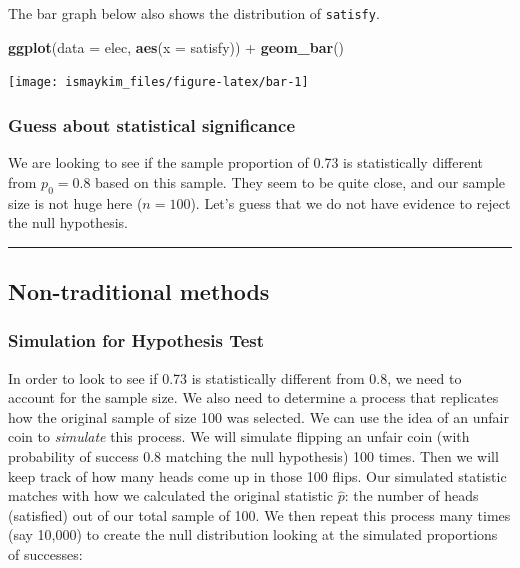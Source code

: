 \documentclass[]{tufte-book}
\newenvironment{Shaded}{\begin{snugshade}}{\end{snugshade}}
\newcommand{\KeywordTok}[1]{\textcolor[rgb]{0.13,0.29,0.53}{\textbf{{#1}}}}
\newcommand{\DataTypeTok}[1]{\textcolor[rgb]{0.13,0.29,0.53}{{#1}}}
\newcommand{\StringTok}[1]{\textcolor[rgb]{0.31,0.60,0.02}{{#1}}}
\newcommand{\NormalTok}[1]{{#1}}
\let\oldrule=\rule
\renewcommand{\rule}[1]{\oldrule{\linewidth}}
\begin{document}
The bar graph below also shows the distribution of \texttt{satisfy}.

\begin{Shaded}
\begin{Highlighting}[]
\KeywordTok{ggplot}\NormalTok{(}\DataTypeTok{data =} \NormalTok{elec, }\KeywordTok{aes}\NormalTok{(}\DataTypeTok{x =} \NormalTok{satisfy)) +}\StringTok{ }\KeywordTok{geom_bar}\NormalTok{()}
\end{Highlighting}
\end{Shaded}

\begin{center}\texttt{[image: ismaykim\_files/figure-latex/bar-1]} \end{center}

\subsubsection{Guess about statistical
significance}\label{guess-about-statistical-significance-1}

We are looking to see if the sample proportion of 0.73 is statistically
different from \(p_0 = 0.8\) based on this sample. They seem to be quite
close, and our sample size is not huge here (\(n = 100\)). Let's guess
that we do not have evidence to reject the null hypothesis.

\begin{center}\rule{0.5\linewidth}{\linethickness}\end{center}

\subsection{Non-traditional methods}\label{non-traditional-methods-1}

\subsubsection{Simulation for Hypothesis
Test}\label{simulation-for-hypothesis-test}

In order to look to see if 0.73 is statistically different from 0.8, we
need to account for the sample size. We also need to determine a process
that replicates how the original sample of size 100 was selected. We can
use the idea of an unfair coin to \emph{simulate} this process. We will
simulate flipping an unfair coin (with probability of success 0.8
matching the null hypothesis) 100 times. Then we will keep track of how
many heads come up in those 100 flips. Our simulated statistic matches
with how we calculated the original statistic \(\hat{p}\): the number of
heads (satisfied) out of our total sample of 100. We then repeat this
process many times (say 10,000) to create the null distribution looking
at the simulated proportions of successes:
\end{document}
